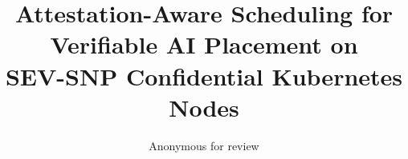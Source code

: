 \documentclass[10pt,conference]{IEEEtran}
\title{Attestation-Aware Scheduling for Verifiable AI Placement on\\SEV-SNP Confidential Kubernetes Nodes}
\author{Anonymous for review}
\begin{document}
\maketitle

















\balance


\end{document}

